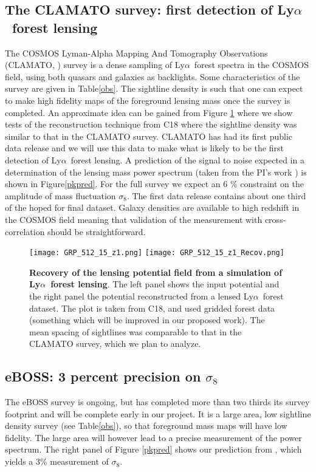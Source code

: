 \documentclass[12pt]{article}
\def\lya{Ly$\alpha$}
\begin{document}
\begin{small}
\subsection{The CLAMATO survey: first detection of \lya\ forest lensing}

The COSMOS Lyman-Alpha Mapping And Tomography Observations (CLAMATO,
\cite{clamato})
 survey is a dense sampling of \lya\ forest spectra in the
COSMOS field, using both quasars and galaxies as backlights.
Some characteristics of the survey are given in Table\ref{obs}. The
sightline density is such that one can expect to make high
fidelity maps of the foreground lensing mass once the survey is completed.
An approximate idea can be gained from Figure \ref{recon} where we show
tests of the reconstruction technique from C18 where the sightline
density was similar to that in the CLAMATO survey. 
CLAMATO has had its first public data release \cite{clamato} and
we will use this data to make what is likely to be the first 
detection of \lya\ forest lensing. A prediction of the 
signal to noise expected in a determination of the lensing mass power spectrum
(taken from the PI's work 
\cite{metcalfandcroft}) is shown in Figure\ref{pkpred}. For
the full survey we expect an 6 \%  constraint on the amplitude
of mass fluctuation $\sigma_{8}$. The first data release contains about
one third of the hoped for final dataset. Galaxy densities are available
to high redshift in the COSMOS field meaning that validation of the
measurement with cross-correlation should be straightforward.

\begin{figure}
  \begin{center}
    \texttt{[image: GRP\_512\_15\_z1.png]}
    \texttt{[image: GRP\_512\_15\_z1\_Recov.png]}
  \end{center}
  \caption{
{\bf Recovery of the lensing potential field from a simulation of \lya\ forest
lensing}. The left panel shows the input potential and the right panel
the potential reconstructed from a lensed \lya\ forest dataset. The plot is taken from C18, and used gridded forest data (something which will
be improved in our proposed work). The mean spacing of sightlines was 
comparable to that in the CLAMATO survey, which we plan to analyze.
           }
  \label{recon}
\end{figure}

\subsection{eBOSS: 3 percent precision on $\sigma_{8}$}
The eBOSS survey is ongoing, but has completed more than two thirds its survey
footprint and will be complete early in our project.
It is a large area, low sightline density survey (see Table\ref{obs}), so
that foreground mass maps will have low fidelity. The large area will
however lead to a precise measurement of the power spectrum.
The right panel of Figure \ref{pkpred} shows our prediction from 
\cite{metcalfandcroft}, which yields a 3\% measurement of $\sigma_{8}$.


\end{small}
\end{document}
